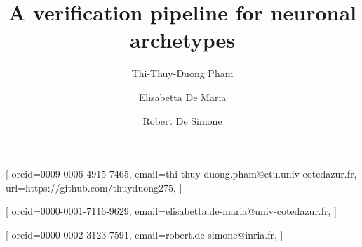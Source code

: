 \documentclass[
]{ceurart}
\begin{document}


\title{A verification pipeline for neuronal archetypes}

\author[1]{Thi-Thuy-Duong Pham}[%
orcid=0009-0006-4915-7465,
email=thi-thuy-duong.pham@etu.univ-cotedazur.fr,
url=https://github.com/thuyduong275,
]

\cormark[1]
\address[1]{I3S, CNRS, Université Côte d'Azur, Sophia Antipolis, France}

\author[1]{Elisabetta De Maria}[%
orcid=0000-0001-7116-9629,
email=elisabetta.de-maria@univ-cotedazur.fr,
]
\address[1]{I3S, CNRS, Université Côte d'Azur, Sophia Antipolis, France}

\author[2]{Robert De Simone}[%
orcid=0000-0002-3123-7591,
email=robert.de-simone@inria.fr,
]
\address[2]{Centre Inria d'Université Côte d'Azur, Sophia Antipolis, France}

\end{document}
